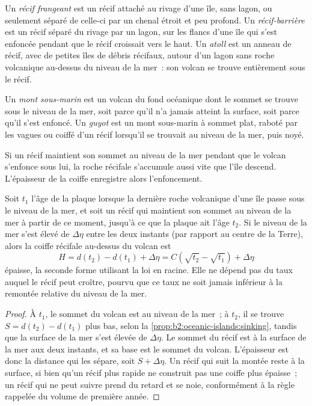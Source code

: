 \begin{definition}\label{def:b2:oceanic-islands:reefs}
Un \emph{récif frangeant} est un récif attaché au rivage d'une île, sans lagon, ou seulement
séparé de celle-ci par un chenal étroit et peu profond. Un \emph{récif-barrière} est
un récif séparé du rivage par un lagon, sur les flancs d'une île qui s'est enfoncée pendant que le récif croissait
vers le haut. Un \emph{atoll} est un anneau de récif, avec de petites îles de débris récifaux, autour
d'un lagon sans roche volcanique au-dessus du niveau de la mer~: son volcan se trouve entièrement sous le récif.
\end{definition}

\begin{definition}\label{def:b2:oceanic-islands:seamount}
Un \emph{mont sous-marin} est un volcan du fond océanique dont le sommet
se trouve sous le niveau de la mer, soit parce qu'il n'a jamais atteint la surface, soit parce
qu'il s'est enfoncé. Un \emph{guyot} est un mont sous-marin à sommet plat, raboté
par les vagues ou coiffé d'un récif lorsqu'il se trouvait au niveau de la mer, puis noyé.
\end{definition}

Si un récif maintient son sommet au niveau de la mer pendant que le volcan s'enfonce sous lui, la roche
récifale s'accumule aussi vite que l'île descend. L'épaisseur de la coiffe enregistre alors l'enfoncement.

\begin{proposition}\label{prop:b2:oceanic-islands:cap}
Soit $t_1$ l'âge de la plaque lorsque la dernière roche volcanique d'une île passe sous le niveau de
la mer, et soit un récif qui maintient son sommet au niveau de la mer à partir de ce moment, jusqu'à
ce que la plaque ait l'âge $t_2$. Si le niveau de la mer s'est élevé de $\Delta\eta$ entre les
deux instants (par rapport au centre de la Terre), alors la coiffe récifale au-dessus du volcan est
\[
H = d(t_2) - d(t_1) + \Delta\eta = C\left(\sqrt{t_2} - \sqrt{t_1}\right) + \Delta\eta
\]
épaisse, la seconde forme utilisant la loi en racine. Elle ne dépend pas du taux auquel le récif
peut croître, pourvu que ce taux ne soit jamais inférieur à la remontée relative du niveau de la mer.
\end{proposition}

\begin{proof}
À $t_1$, le sommet du volcan est au niveau de la mer~; à $t_2$, il se trouve $S = d(t_2) - d(t_1)$ plus
bas, selon la \cref{prop:b2:oceanic-islands:sinking}, tandis que la surface de la mer s'est élevée de
$\Delta\eta$. Le sommet du récif est à la surface de la mer aux deux instants, et sa base est le sommet du
volcan. L'épaisseur est donc la distance qui les sépare, soit $S + \Delta\eta$. Un récif qui suit la montée
reste à la surface, si bien qu'un récif plus rapide ne construit pas une coiffe plus épaisse~; un récif qui
ne peut suivre prend du retard et se noie, conformément à la règle rappelée du volume de première année.
\end{proof}


